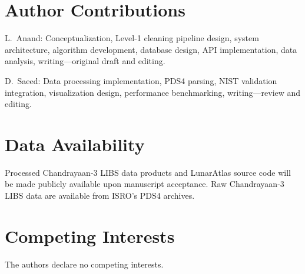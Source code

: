 \documentclass[12pt,a4paper]{article}
\begin{document}
\section*{Author Contributions}

L.~Anand: Conceptualization, Level-1 cleaning pipeline design, system architecture, algorithm development, database design, API implementation, data analysis, writing---original draft and editing.

D.~Saeed: Data processing implementation, PDS4 parsing, NIST validation integration, visualization design, performance benchmarking, writing---review and editing.

\section*{Data Availability}

Processed Chandrayaan-3 LIBS data products and LunarAtlas source code will be made publicly available upon manuscript acceptance. Raw Chandrayaan-3 LIBS data are available from ISRO's PDS4 archives.

\section*{Competing Interests}

The authors declare no competing interests.

\end{document}
